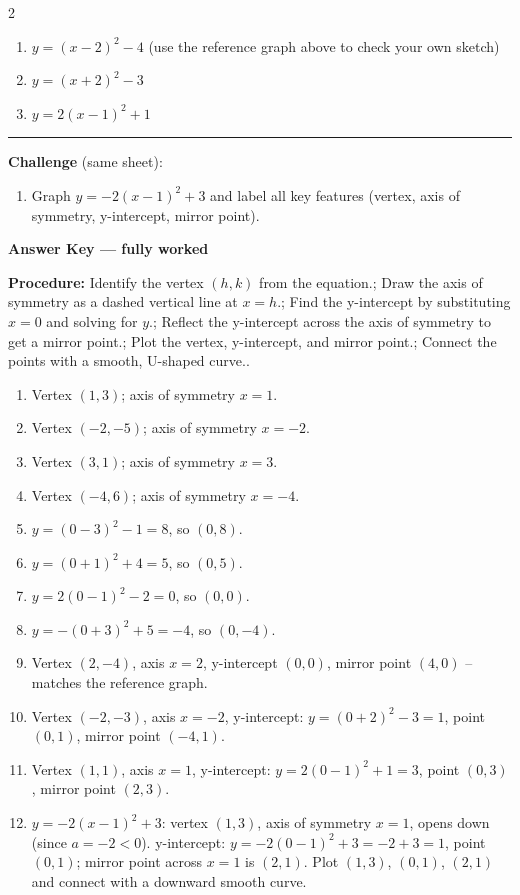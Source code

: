\documentclass[12pt]{article}
\begin{document}
\begin{multicols}{2}
\begin{enumerate}[label=\textbf{\arabic*.}, start=9, itemsep=3cm]
  \item $y=(x-2)^2-4$ (use the reference graph above to check your own sketch)
  \item $\displaystyle y=(x+2)^2-3$
  \item $\displaystyle y=2(x-1)^2+1$
\end{enumerate}
\end{multicols}

\vspace{0.2cm}\hrule\vspace{0.3cm}
\textbf{Challenge} (same sheet):\\[4pt]
\begin{enumerate}[label=\textbf{\arabic*.}, start=12, itemsep=2.2cm]
  \item Graph $y=-2(x-1)^2+3$ and label all key features (vertex, axis of symmetry, y-intercept, mirror point).
\end{enumerate}

\newpage

\begin{center}{\Large \textbf{Answer Key --- fully worked}}\end{center}
\vspace{0.25cm}
\textbf{Procedure:} Identify the vertex $(h,k)$ from the equation.; Draw the axis of symmetry as a dashed vertical line at $x=h$.; Find the y-intercept by substituting $x=0$ and solving for $y$.; Reflect the y-intercept across the axis of symmetry to get a mirror point.; Plot the vertex, y-intercept, and mirror point.; Connect the points with a smooth, U-shaped curve..\\[8pt]
\begin{enumerate}[label=\textbf{\arabic*.},itemsep=7pt]
  \item Vertex $(1,3)$; axis of symmetry $x=1$.
  \item Vertex $(-2,-5)$; axis of symmetry $x=-2$.
  \item Vertex $(3,1)$; axis of symmetry $x=3$.
  \item Vertex $(-4,6)$; axis of symmetry $x=-4$.
  \item $y=(0-3)^2-1=8$, so $(0,8)$.
  \item $y=(0+1)^2+4=5$, so $(0,5)$.
  \item $y=2(0-1)^2-2=0$, so $(0,0)$.
  \item $y=-(0+3)^2+5=-4$, so $(0,-4)$.
  \item Vertex $(2,-4)$, axis $x=2$, y-intercept $(0,0)$, mirror point $(4,0)$ -- matches the reference graph.
  \item Vertex $(-2,-3)$, axis $x=-2$, y-intercept: $y=(0+2)^2-3=1$, point $(0,1)$, mirror point $(-4,1)$.
  \item Vertex $(1,1)$, axis $x=1$, y-intercept: $y=2(0-1)^2+1=3$, point $(0,3)$, mirror point $(2,3)$.
  \item $y=-2(x-1)^2+3$: vertex $(1,3)$, axis of symmetry $x=1$, opens down (since $a=-2<0$). y-intercept: $y=-2(0-1)^2+3=-2+3=1$, point $(0,1)$; mirror point across $x=1$ is $(2,1)$. Plot $(1,3)$, $(0,1)$, $(2,1)$ and connect with a downward smooth curve.
\end{enumerate}
\end{document}
